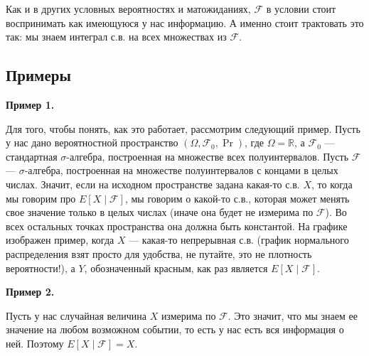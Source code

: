 \documentclass[12pt]{article}
\newcommand\R{\mathbb{R}}
\newcommand\F{\mathcal{F}}
\begin{document}
Как и в других условных вероятностях и матожиданиях, $\F$ в условии стоит воспринимать как имеющуюся у нас информацию. А именно стоит трактовать это так: мы знаем интеграл с.в. на всех множествах из $\F$.

\subsection{Примеры}

\textbf{Пример 1.}

Для того, чтобы понять, как это работает, рассмотрим следующий пример. Пусть у нас дано вероятностной пространство $(\Omega, \F_0, \Pr)$, где $\Omega = \R$, а $\F_0$ --- стандартная $\sigma$-алгебра, построенная на множестве всех полуинтервалов. Пусть $\F$ --- $\sigma$-алгебра, построенная на множестве полуинтервалов с концами в целых числах. Значит, если на исходном пространстве задана какая-то с.в. $X$, то когда мы говорим про $E[X \mid \F]$, мы говорим о какой-то с.в., которая может менять свое значение только в целых числах (иначе она будет не измерима по $\F$). Во всех остальных точках пространства она должна быть константой. На графике изображен пример, когда $X$ --- какая-то непрерывная с.в. (график нормального распределения взят просто для удобства, не путайте, это не плотность вероятности!), а $Y$, обозначенный красным, как раз является $E[X \mid \F]$.

\begin{center}
\end{center}

\textbf{Пример 2.}

Пусть у нас случайная величина $X$ измерима по $\F$. Это значит, что мы знаем ее значение на любом возможном событии, то есть у нас есть вся информация о ней. Поэтому $E[X \mid \F] = X$.
\end{document}
